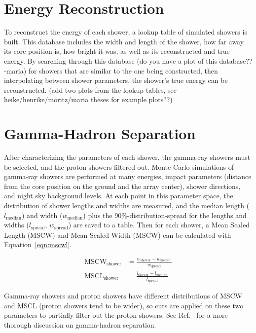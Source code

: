 \section{Energy Reconstruction}\label{subsec:enrecon}
To reconstruct the energy of each shower, a lookup table of simulated showers is built.
This database includes the width and length of the shower, how far away its core position is, how bright it was, as well as its reconstructed and true energy.
By searching through this {\color{red}database (do you have a plot of this database?? -maria)} for showers that are similar to the one being constructed, then interpolating between shower parameters, the shower's true energy can be reconstructed.
{\color{red}(add two plots from the lookup tables, see heike/henrike/moritz/maria theses for example plots??)}

\section{Gamma-Hadron Separation}
After characterizing the parameters of each shower, the gamma-ray showers must be selected, and the proton showers filtered out.
Monte Carlo simulations of gamma-ray showers are performed at many energies, impact parameters (distance from the core position on the ground and the array center), shower directions, and night sky background levels.
At each point in this parameter space, the distribution of shower lengths and widths are measured, and the median length ($l_{\textrm{median}}$) and width ($w_{\textrm{median}}$) plus the 90\%-distribution-spread for the lengths and widths ($l_{\textrm{spread}}$, $w_{\textrm{spread}}$) are saved to a table.
Then for each shower, a Mean Scaled Length (MSCW) and Mean Scaled Width (MSCW) can be calculated with Equation~\ref{eqn:mscwl}.

\begin{equation}\label{eqn:mscwl}
  \begin{split}
    \textrm{MSCW}_{\textrm{shower}} & = \frac{w_{\textrm{shower}}-w_{\textrm{median}}}{w_{\textrm{spread}}} \\
    \textrm{MSCL}_{\textrm{shower}} & = \frac{l_{\textrm{shower}}-l_{\textrm{median}}}{l_{\textrm{spread}}}
  \end{split}
\end{equation}

Gamma-ray showers and proton showers have different distributions of MSCW and MSCL (proton showers tend to be wider), so cuts are applied on these two parameters to partially filter out the proton showers.
See Ref.~\cite{Krause2017} for a more thorough discussion on gamma-hadron separation.

